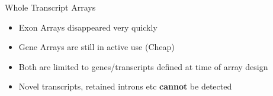 \documentclass[aspectratio=169,11pt]{beamer}
\begin{document}
\begin{frame}{Whole Transcript Arrays}

	\begin{itemize}
		\item Exon Arrays disappeared very quickly
		\item Gene Arrays are still in active use (Cheap)
		\item Both are limited to genes/transcripts defined at time of array design
		\item Novel transcripts, retained introns etc \textbf{cannot} be detected 
	\end{itemize}

\end{frame}



%
%
%
%
%
%
%
%
%
%	
%
\end{document}
